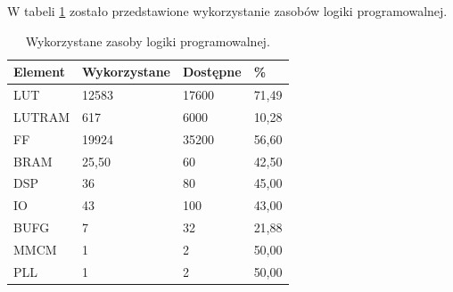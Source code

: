 W tabeli \ref{tab:fpgautilization} zostało przedstawione wykorzystanie zasobów logiki programowalnej.
\begin{table}[]
\centering
\caption{Wykorzystane zasoby logiki programowalnej.}
\label{tab:fpgautilization}
\begin{tabular}{|l|l|l|l|}
\hline
Element & Wykorzystane & Dostępne & \% \\ \hline %
LUT & 12583 & 17600 & 71,49 \\ \hline
LUTRAM & 617 & 6000 & 10,28 \\ \hline
FF & 19924 & 35200 & 56,60 \\ \hline
BRAM & 25,50 & 60 & 42,50 \\ \hline
DSP & 36 & 80 & 45,00 \\ \hline
IO & 43 & 100 & 43,00 \\ \hline
BUFG & 7 & 32 & 21,88 \\ \hline
MMCM & 1 & 2 & 50,00 \\ \hline
PLL & 1 & 2 & 50,00 \\ \hline
\end{tabular}
\end{table}

